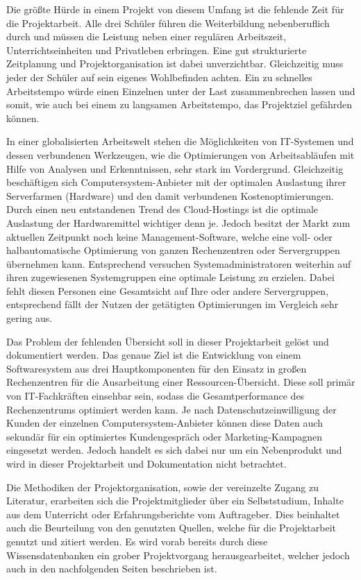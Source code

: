 Die größte Hürde in einem Projekt von diesem Umfang ist die fehlende Zeit für
die Projektarbeit. Alle drei Schüler führen die Weiterbildung nebenberuflich
durch und müssen die Leistung neben einer regulären Arbeitszeit,
Unterrichtseinheiten und Privatleben erbringen. Eine gut strukturierte
Zeitplanung und Projektorganisation ist dabei unverzichtbar. Gleichzeitig muss
jeder der Schüler auf sein eigenes Wohlbefinden achten. Ein zu schnelles
Arbeitstempo würde einen Einzelnen unter der Last zusammenbrechen lassen und
somit, wie auch bei einem zu langsamen Arbeitstempo, das Projektziel gefährden
können.

In einer globalisierten Arbeitswelt stehen die Möglichkeiten von IT-Systemen
und dessen verbundenen Werkzeugen, wie die Optimierungen von Arbeitsabläufen
mit Hilfe von Analysen und Erkenntnissen, sehr stark im Vordergrund.
Gleichzeitig beschäftigen sich Computersystem-Anbieter mit der optimalen
Auslastung ihrer Serverfarmen (Hardware) und den damit verbundenen
Kostenoptimierungen. Durch einen neu entstandenen Trend des Cloud-Hostings ist
die optimale Auslastung der Hardwaremittel wichtiger denn je. Jedoch besitzt
der Markt zum aktuellen Zeitpunkt noch keine Management-Software, welche
eine voll- oder halbautomatische Optimierung von ganzen Rechenzentren oder
Servergruppen übernehmen kann. Entsprechend versuchen Systemadministratoren
weiterhin auf ihren zugewiesenen Systemgruppen eine optimale Leistung zu
erzielen. Dabei fehlt diesen Personen eine Gesamtsicht auf Ihre oder andere
Servergruppen, entsprechend fällt der Nutzen der getätigten Optimierungen im
Vergleich sehr gering aus.

Das Problem der fehlenden Übersicht soll in dieser Projektarbeit gelöst und
dokumentiert werden. Das genaue Ziel ist die Entwicklung von einem
Softwaresystem aus drei Hauptkomponenten für den Einsatz in großen
Rechenzentren für die Ausarbeitung einer Ressourcen-Übersicht. Diese soll
primär von IT-Fachkräften einsehbar sein, sodass die Gesamtperformance des
Rechenzentrums optimiert werden kann. Je nach Datenschutzeinwilligung der
Kunden der einzelnen Computersystem-Anbieter können diese Daten auch
sekundär für ein optimiertes Kundengespräch oder Marketing-Kampagnen eingesetzt
werden. Jedoch handelt es sich dabei nur um ein Nebenprodukt und wird in dieser
Projektarbeit und Dokumentation nicht betrachtet.

Die Methodiken der Projektorganisation, sowie der vereinzelte Zugang zu
Literatur, erarbeiten sich die Projektmitglieder über ein Selbststudium,
Inhalte aus dem Unterricht oder Erfahrungsberichte vom Auftrageber. Dies
beinhaltet auch die Beurteilung von den genutzten Quellen, welche für die
Projektarbeit genutzt und zitiert werden. Es wird vorab bereits durch diese
Wissensdatenbanken ein grober Projektvorgang herausgearbeitet, welcher jedoch
auch in den nachfolgenden Seiten beschrieben ist.
\all%

